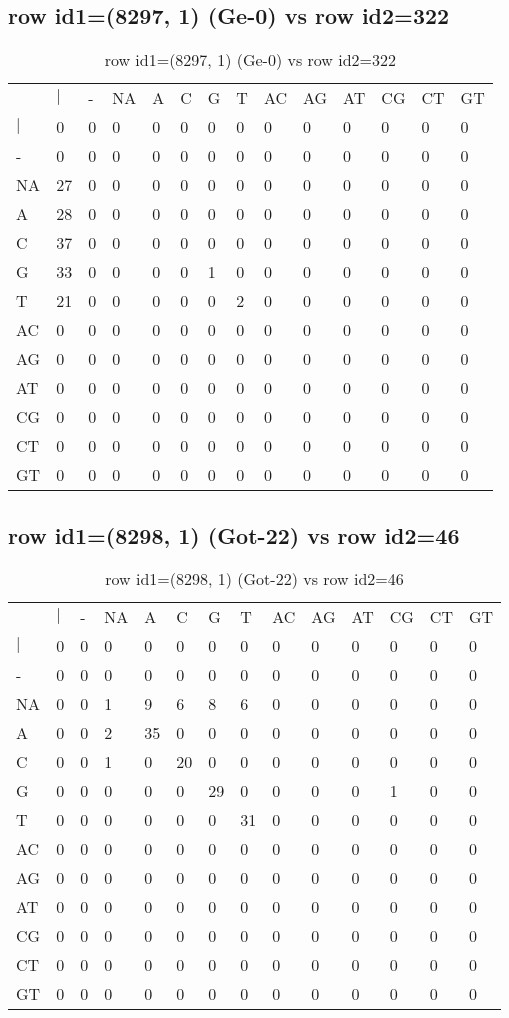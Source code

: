 \subsection{row id1=(8297, 1) (Ge-0) vs row id2=322}
\begin{center}
\begin{longtable}{|l|l|l|l|l|l|l|l|l|l|l|l|l|l|}
\caption{row id1=(8297, 1) (Ge-0) vs row id2=322} \label{table_dm278}\\
\hline
\\
\hline
&$|$&-&NA&A&C&G&T&AC&AG&AT&CG&CT&GT\\
$|$&0&0&0&0&0&0&0&0&0&0&0&0&0\\
-&0&0&0&0&0&0&0&0&0&0&0&0&0\\
NA&27&0&0&0&0&0&0&0&0&0&0&0&0\\
A&28&0&0&0&0&0&0&0&0&0&0&0&0\\
C&37&0&0&0&0&0&0&0&0&0&0&0&0\\
G&33&0&0&0&0&1&0&0&0&0&0&0&0\\
T&21&0&0&0&0&0&2&0&0&0&0&0&0\\
AC&0&0&0&0&0&0&0&0&0&0&0&0&0\\
AG&0&0&0&0&0&0&0&0&0&0&0&0&0\\
AT&0&0&0&0&0&0&0&0&0&0&0&0&0\\
CG&0&0&0&0&0&0&0&0&0&0&0&0&0\\
CT&0&0&0&0&0&0&0&0&0&0&0&0&0\\
GT&0&0&0&0&0&0&0&0&0&0&0&0&0\\
\hline
\end{longtable}
\end{center}

\subsection{row id1=(8298, 1) (Got-22) vs row id2=46}
\begin{center}
\begin{longtable}{|l|l|l|l|l|l|l|l|l|l|l|l|l|l|}
\caption{row id1=(8298, 1) (Got-22) vs row id2=46} \label{table_dm280}\\
\hline
\\
\hline
&$|$&-&NA&A&C&G&T&AC&AG&AT&CG&CT&GT\\
$|$&0&0&0&0&0&0&0&0&0&0&0&0&0\\
-&0&0&0&0&0&0&0&0&0&0&0&0&0\\
NA&0&0&1&9&6&8&6&0&0&0&0&0&0\\
A&0&0&2&35&0&0&0&0&0&0&0&0&0\\
C&0&0&1&0&20&0&0&0&0&0&0&0&0\\
G&0&0&0&0&0&29&0&0&0&0&1&0&0\\
T&0&0&0&0&0&0&31&0&0&0&0&0&0\\
AC&0&0&0&0&0&0&0&0&0&0&0&0&0\\
AG&0&0&0&0&0&0&0&0&0&0&0&0&0\\
AT&0&0&0&0&0&0&0&0&0&0&0&0&0\\
CG&0&0&0&0&0&0&0&0&0&0&0&0&0\\
CT&0&0&0&0&0&0&0&0&0&0&0&0&0\\
GT&0&0&0&0&0&0&0&0&0&0&0&0&0\\
\hline
\end{longtable}
\end{center}

